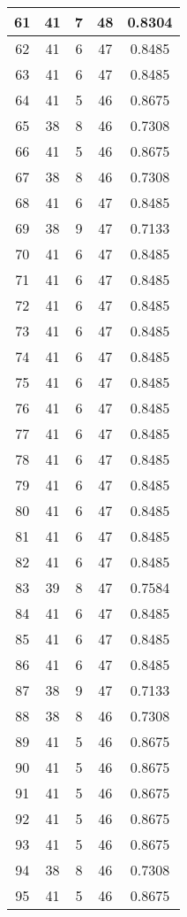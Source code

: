 \documentclass[letterpaper, 12pt]{article}
\begin{document}
\begin{longtable}{|c|c|c|c|c|}
\hline
61 & 41 & 7 & 48 & 0.8304 \\
\hline
62 & 41 & 6 & 47 & 0.8485 \\
\hline
63 & 41 & 6 & 47 & 0.8485 \\
\hline
64 & 41 & 5 & 46 & 0.8675 \\
\hline
65 & 38 & 8 & 46 & 0.7308 \\
\hline
66 & 41 & 5 & 46 & 0.8675 \\
\hline
67 & 38 & 8 & 46 & 0.7308 \\
\hline
68 & 41 & 6 & 47 & 0.8485 \\
\hline
69 & 38 & 9 & 47 & 0.7133 \\
\hline
70 & 41 & 6 & 47 & 0.8485 \\
\hline
71 & 41 & 6 & 47 & 0.8485 \\
\hline
72 & 41 & 6 & 47 & 0.8485 \\
\hline
73 & 41 & 6 & 47 & 0.8485 \\
\hline
74 & 41 & 6 & 47 & 0.8485 \\
\hline
75 & 41 & 6 & 47 & 0.8485 \\
\hline
76 & 41 & 6 & 47 & 0.8485 \\
\hline
77 & 41 & 6 & 47 & 0.8485 \\
\hline
78 & 41 & 6 & 47 & 0.8485 \\
\hline
79 & 41 & 6 & 47 & 0.8485 \\
\hline
80 & 41 & 6 & 47 & 0.8485 \\
\hline
81 & 41 & 6 & 47 & 0.8485 \\
\hline
82 & 41 & 6 & 47 & 0.8485 \\
\hline
83 & 39 & 8 & 47 & 0.7584 \\
\hline
84 & 41 & 6 & 47 & 0.8485 \\
\hline
85 & 41 & 6 & 47 & 0.8485 \\
\hline
86 & 41 & 6 & 47 & 0.8485 \\
\hline
87 & 38 & 9 & 47 & 0.7133 \\
\hline
88 & 38 & 8 & 46 & 0.7308 \\
\hline
89 & 41 & 5 & 46 & 0.8675 \\
\hline
90 & 41 & 5 & 46 & 0.8675 \\
\hline
91 & 41 & 5 & 46 & 0.8675 \\
\hline
92 & 41 & 5 & 46 & 0.8675 \\
\hline
93 & 41 & 5 & 46 & 0.8675 \\
\hline
94 & 38 & 8 & 46 & 0.7308 \\
\hline
95 & 41 & 5 & 46 & 0.8675 \\

\end{longtable}
\end{document}
